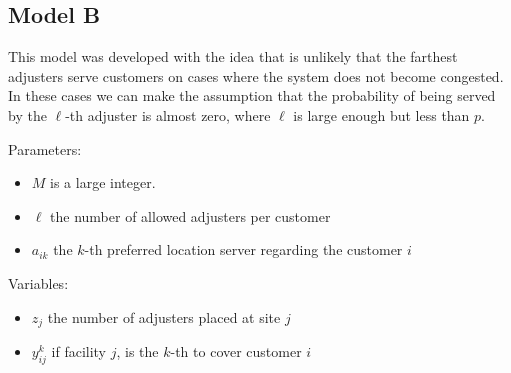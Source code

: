 
\subsection{Model B}
  
\begin{frame}
  This model was developed with the idea that is unlikely that
  the farthest adjusters serve customers on cases where the system does not become congested.
  In these cases we can make the assumption that the probability of being served by the $\ell$-th 
  adjuster is almost zero, where $\ell$ is large enough but less than $p$.

  Parameters:
  \begin{itemize}
  \item $M$ is a large integer.
  \item $\ell$ the number of allowed adjusters per customer
  \item $a_{ik}$ the $k$-th preferred location server regarding the customer $i$
  \end{itemize}

  Variables:
  \begin{itemize}
  \item $z_j$ the number of adjusters placed at site $j$
  \item $y_{ij}^k$ if facility $j$, is the $k$-th to cover customer $i$
  \end{itemize}

\end{frame}

